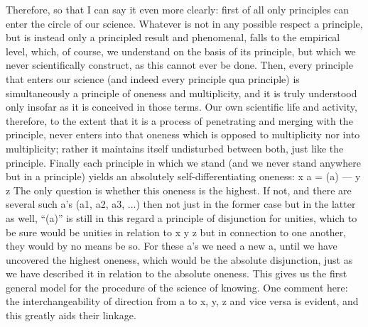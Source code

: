 Therefore, so that I can say it even more clearly:
first of all only principles can enter the circle of our science.
Whatever is not in any possible respect a principle,
but is instead only a principled result and phenomenal,
falls to the empirical level,
which, of course, we understand
on the basis of its principle,
but which we never scientifically construct,
as this cannot ever be done.
Then, every principle that enters our science
(and indeed every principle qua principle) is
simultaneously a principle of oneness and multiplicity,
and it is truly understood only insofar
as it is conceived in those terms.
Our own scientific life and activity,
therefore, to the extent that it is a process of
penetrating and merging with the principle,
never enters into that oneness
which is opposed to multiplicity
nor into multiplicity;
rather it maintains itself undisturbed between both,
just like the principle.
Finally each principle in which we stand
(and we never stand anywhere but in a principle)
yields an absolutely self-differentiating oneness:
x {a = (a) — y} z
The only question is whether this oneness is the highest.
If not, and there are several such a's
(a1, a2, a3, ...)
then not just in the former case
but in the latter as well,
“(a)” is still in this regard
a principle of disjunction for unities,
which to be sure would be unities
in relation to x y z
but in connection to one another,
they would by no means be so.
For these a's we need a new a,
until we have uncovered the highest oneness,
which would be the absolute disjunction,
just as we have described it in relation
to the absolute oneness.
This gives us the first general model
for the procedure of the science of knowing.
One comment here: the interchangeability of
direction from a to x, y, z
and vice versa is evident,
and this greatly aids their linkage.

